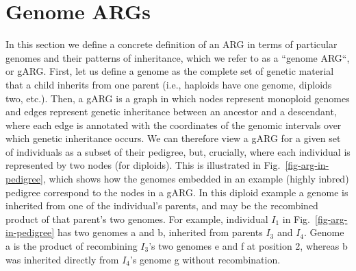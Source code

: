 \documentclass{article}
\begin{document}
\section*{Genome ARGs}
In this section we define a concrete definition of an ARG in terms
of particular genomes and their patterns of inheritance, which
we refer to as a ``genome ARG``, or gARG.
First, let us define a genome as the complete set of genetic material that a child
inherits from one parent (i.e., haploids have one genome, diploids two, etc.).
Then, a gARG is a graph in which nodes represent
monoploid genomes  and edges represent
genetic inheritance between an ancestor and a descendant,
where each edge is annotated with the coordinates
of the genomic intervals over which genetic inheritance occurs.
We can therefore view a gARG for a given set of individuals
as a subset of their pedigree, but, crucially,
where each individual is represented by two nodes (for diploids).
This is illustrated in Fig.~\ref{fig-arg-in-pedigree},
which
shows how the genomes embedded in an example (highly inbred)
pedigree correspond to the nodes in a gARG.
In this diploid example
a genome is inherited from one
of the individual's parents,
and may be the recombined product of that parent's two genomes.
For example, individual $I_1$ in Fig.~\ref{fig-arg-in-pedigree}
has two genomes \textsf{a} and \textsf{b},
inherited from parents $I_3$ and $I_4$. Genome \textsf{a} is the product of
recombining $I_3$'s two genomes \textsf{e} and \textsf{f} at position 2,
whereas \textsf{b} was inherited directly from $I_4$'s genome \textsf{g} without
recombination.
\end{document}

